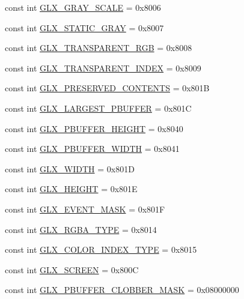 \begin{DoxyCompactItemize}
\item 
const int \hyperlink{class_tao_1_1_platform_1_1_x11_1_1_glx_a5ba311a88aac071d258bcc41575e771c}{GLX\_\-GRAY\_\-SCALE} = 0x8006
\item 
const int \hyperlink{class_tao_1_1_platform_1_1_x11_1_1_glx_a9eaa0fc788ced88feee6d0cbfc083c86}{GLX\_\-STATIC\_\-GRAY} = 0x8007
\item 
const int \hyperlink{class_tao_1_1_platform_1_1_x11_1_1_glx_a327c03a517966cea8af701bc311ddc85}{GLX\_\-TRANSPARENT\_\-RGB} = 0x8008
\item 
const int \hyperlink{class_tao_1_1_platform_1_1_x11_1_1_glx_a4d22273f56dbecae8152d8db2e95000e}{GLX\_\-TRANSPARENT\_\-INDEX} = 0x8009
\item 
const int \hyperlink{class_tao_1_1_platform_1_1_x11_1_1_glx_a33545f2488ed80af9bce684fe52d0215}{GLX\_\-PRESERVED\_\-CONTENTS} = 0x801B
\item 
const int \hyperlink{class_tao_1_1_platform_1_1_x11_1_1_glx_a19dcd43808f2415373c4f1369ac0b881}{GLX\_\-LARGEST\_\-PBUFFER} = 0x801C
\item 
const int \hyperlink{class_tao_1_1_platform_1_1_x11_1_1_glx_a2caba72e0d68ed8925433140b69cae1f}{GLX\_\-PBUFFER\_\-HEIGHT} = 0x8040
\item 
const int \hyperlink{class_tao_1_1_platform_1_1_x11_1_1_glx_a3befe7327e4d27a9361056283a741b3a}{GLX\_\-PBUFFER\_\-WIDTH} = 0x8041
\item 
const int \hyperlink{class_tao_1_1_platform_1_1_x11_1_1_glx_a20f2b47a4e7d251d68992f8af2250b30}{GLX\_\-WIDTH} = 0x801D
\item 
const int \hyperlink{class_tao_1_1_platform_1_1_x11_1_1_glx_acd3e11028d125afbbf1e8a34b156e44a}{GLX\_\-HEIGHT} = 0x801E
\item 
const int \hyperlink{class_tao_1_1_platform_1_1_x11_1_1_glx_a1a6cc2a5122e3ab70b2af77556b04c5a}{GLX\_\-EVENT\_\-MASK} = 0x801F
\item 
const int \hyperlink{class_tao_1_1_platform_1_1_x11_1_1_glx_a9d98f89beff5043030c657aa94352647}{GLX\_\-RGBA\_\-TYPE} = 0x8014
\item 
const int \hyperlink{class_tao_1_1_platform_1_1_x11_1_1_glx_aca5ff459ff309805a054eb5af32d091c}{GLX\_\-COLOR\_\-INDEX\_\-TYPE} = 0x8015
\item 
const int \hyperlink{class_tao_1_1_platform_1_1_x11_1_1_glx_a0b9ae4d32b7263fa6c4a8c8fa35030c9}{GLX\_\-SCREEN} = 0x800C
\item 
const int \hyperlink{class_tao_1_1_platform_1_1_x11_1_1_glx_a8a9f936a285b35c0aa0a3054c135b4cc}{GLX\_\-PBUFFER\_\-CLOBBER\_\-MASK} = 0x08000000

\end{DoxyCompactItemize}
